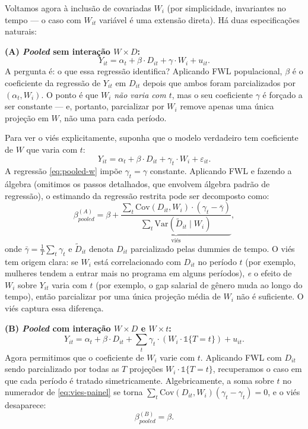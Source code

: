 Voltamos agora à inclusão de covariadas $W_i$ (por simplicidade, invariantes no tempo --- o caso com $W_{it}$ variável é uma extensão direta). Há duas especificações naturais:

\textbf{(A) \textit{Pooled} sem interação $W \times D$:}
\begin{equation}
Y_{it} = \alpha_t + \beta \cdot D_{it} + \gamma \cdot W_i + u_{it}.
\label{eq:pooled-w}
\end{equation}
A pergunta é: o que essa regressão identifica? Aplicando FWL populacional, $\beta$ é o coeficiente da regressão de $Y_{it}$ em $D_{it}$ depois que ambos foram parcializados por $(\alpha_t, W_i)$. O ponto é que $W_i$ \textit{não varia com $t$}, mas o seu coeficiente $\gamma$ é forçado a ser constante --- e, portanto, parcializar por $W_i$ remove apenas uma única projeção em $W$, não uma para cada período.

Para ver o viés explicitamente, suponha que o modelo verdadeiro tem coeficiente de $W$ que varia com $t$:
\begin{equation}
Y_{it} = \alpha_t + \beta \cdot D_{it} + \gamma_t \cdot W_i + \varepsilon_{it}.
\label{eq:modelo-verdadeiro-w}
\end{equation}
A regressão \eqref{eq:pooled-w} impõe $\gamma_t = \gamma$ constante. Aplicando FWL e fazendo a álgebra (omitimos os passos detalhados, que envolvem álgebra padrão de regressão), o estimando da regressão restrita pode ser decomposto como:
\begin{equation}
\beta_{pooled}^{(A)} = \beta + \underbrace{\frac{\sum_t \text{Cov}(D_{it}, W_i) \cdot (\gamma_t - \bar{\gamma})}{\sum_t \text{Var}(\tilde{D}_{it} \mid W_i)}}_{\text{viés}},
\label{eq:vies-painel}
\end{equation}
onde $\bar{\gamma} = \frac{1}{T}\sum_t \gamma_t$ e $\tilde{D}_{it}$ denota $D_{it}$ parcializado pelas dummies de tempo. O viés tem origem clara: se $W_i$ está correlacionado com $D_{it}$ no período $t$ (por exemplo, mulheres tendem a entrar mais no programa em alguns períodos), \textit{e} o efeito de $W_i$ sobre $Y_{it}$ varia com $t$ (por exemplo, o gap salarial de gênero muda ao longo do tempo), então parcializar por uma única projeção média de $W_i$ não é suficiente. O viés captura essa diferença.

\textbf{(B) \textit{Pooled} com interação $W \times D$ e $W \times t$:}
\begin{equation}
Y_{it} = \alpha_t + \beta \cdot D_{it} + \sum_t \gamma_t \cdot (W_i \cdot \mathbb{1}\{T = t\}) + u_{it}.
\label{eq:pooled-w-int}
\end{equation}
Agora permitimos que o coeficiente de $W_i$ varie com $t$. Aplicando FWL com $D_{it}$ sendo parcializado por todas as $T$ projeções $W_i \cdot \mathbb{1}\{T=t\}$, recuperamos o caso em que cada período é tratado simetricamente. Algebricamente, a soma sobre $t$ no numerador de \eqref{eq:vies-painel} se torna $\sum_t \text{Cov}(D_{it}, W_i)(\gamma_t - \gamma_t) = 0$, e o viés desaparece:
\begin{equation}
\beta_{pooled}^{(B)} = \beta.
\label{eq:beta-pooled-b}
\end{equation}

